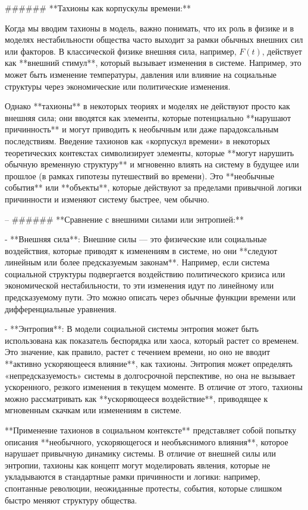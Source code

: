 ###### **Тахионы как корпускулы времени:**

Когда мы вводим тахионы в модель, важно понимать, что их роль в физике и в моделях нестабильности общества часто выходит за рамки обычных внешних сил или факторов. В классической физике внешняя сила, например, \( F(t) \), действует как **внешний стимул**, который вызывает изменения в системе. Например, это может быть изменение температуры, давления или влияние на социальные структуры через экономические или политические изменения.

Однако **тахионы** в некоторых теориях и моделях не действуют просто как внешняя сила; они вводятся как элементы, которые потенциально **нарушают причинность** и могут приводить к необычным или даже парадоксальным последствиям. Введение тахионов как «корпускул времени» в некоторых теоретических контекстах символизирует элементы, которые **могут нарушить обычную временную структуру** и мгновенно влиять на систему в будущее или прошлое (в рамках гипотезы путешествий во времени). Это **необычные события** или **объекты**, которые действуют за пределами привычной логики причинности и изменяют систему быстрее, чем обычно.

--  
###### **Сравнение с внешними силами или энтропией:**

- **Внешняя сила**: Внешние силы — это физические или социальные воздействия, которые приводят к изменениям в системе, но они **следуют линейным или более предсказуемым законам**. Например, если система социальной структуры подвергается воздействию политического кризиса или экономической нестабильности, то эти изменения идут по линейному или предсказуемому пути. Это можно описать через обычные функции времени или дифференциальные уравнения.

- **Энтропия**: В модели социальной системы энтропия может быть использована как показатель беспорядка или хаоса, который растет со временем. Это значение, как правило, растет с течением времени, но оно не вводит **активно ускоряющееся влияние**, как тахионы. Энтропия может определять «непредсказуемость» системы в долгосрочной перспективе, но она не вызывает ускоренного, резкого изменения в текущем моменте. В отличие от этого, тахионы можно рассматривать как **ускоряющееся воздействие**, приводящее к мгновенным скачкам или изменениям в системе.

**Применение тахионов в социальном контексте** представляет собой попытку описания **необычного, ускоряющегося и необъяснимого влияния**, которое нарушает привычную динамику системы. В отличие от внешней силы или энтропии, тахионы как концепт могут моделировать явления, которые не укладываются в стандартные рамки причинности и логики: например, спонтанные революции, неожиданные протесты, события, которые слишком быстро меняют структуру общества.

